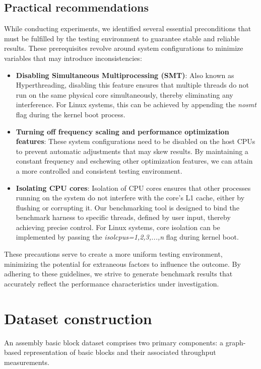 \subsection{Practical recommendations}

While conducting experiments, we identified several essential preconditions that must be fulfilled by the testing environment to guarantee stable and reliable results. These prerequisites revolve around system configurations to minimize variables that may introduce inconsistencies:

\begin{itemize}
	\item \textbf{Disabling Simultaneous Multiprocessing (SMT)}: Also known as Hyperthreading, disabling this feature ensures that multiple threads do not run on the same physical core simultaneously, thereby eliminating any interference. For Linux systems, this can be achieved by appending the \textit{nosmt} flag during the kernel boot process.
	\item \textbf{Turning off frequency scaling and performance optimization features}: These system configurations need to be disabled on the host CPUs to prevent automatic adjustments that may skew results. By maintaining a constant frequency and eschewing other optimization features, we can attain a more controlled and consistent testing environment.
	\item \textbf{Isolating CPU cores}: Isolation of CPU cores ensures that other processes running on the system do not interfere with the core's L1 cache, either by flushing or corrupting it. Our benchmarking tool is designed to bind the benchmark harness to specific threads, defined by user input, thereby achieving precise control. For Linux systems, core isolation can be implemented by passing the \textit{isolcpus=1,2,3,...,n} flag during kernel boot.
\end{itemize}

These precautions serve to create a more uniform testing environment, minimizing the potential for extraneous factors to influence the outcome. By adhering to these guidelines, we strive to generate benchmark results that accurately reflect the performance characteristics under investigation.

\section{Dataset construction}

An assembly basic block dataset comprises two primary components: a graph-based representation of basic blocks and their associated throughput measurements.

